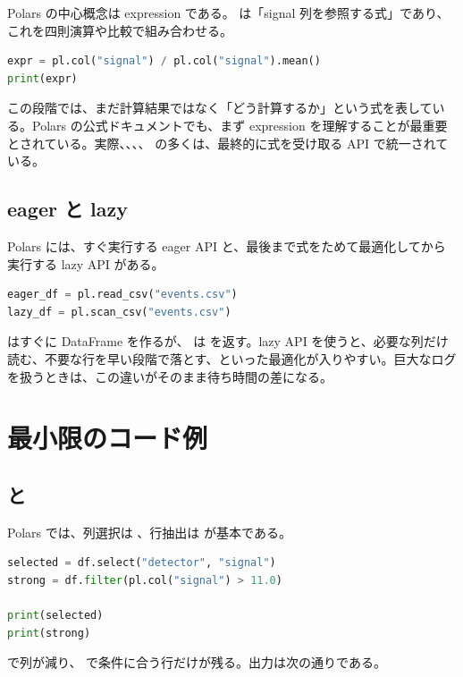 Polars の中心概念は expression である。 は「signal 列を参照する式」であり、これを四則演算や比較で組み合わせる。

\begin{lstlisting}[language=Python]
expr = pl.col("signal") / pl.col("signal").mean()
print(expr)
\end{lstlisting}

この段階では、まだ計算結果ではなく「どう計算するか」という式を表している。Polars の公式ドキュメントでも、まず expression を理解することが最重要とされている。実際、、、、 の多くは、最終的に式を受け取る API で統一されている。

\subsection{eager と lazy}

Polars には、すぐ実行する eager API と、最後まで式をためて最適化してから実行する lazy API がある。

\begin{lstlisting}[language=Python]
eager_df = pl.read_csv("events.csv")
lazy_df = pl.scan_csv("events.csv")
\end{lstlisting}

 はすぐに DataFrame を作るが、 は  を返す。lazy API を使うと、必要な列だけ読む、不要な行を早い段階で落とす、といった最適化が入りやすい。巨大なログを扱うときは、この違いがそのまま待ち時間の差になる。

\section{最小限のコード例}

\subsection{ と }

Polars では、列選択は 、行抽出は  が基本である。

\begin{lstlisting}[language=Python]
selected = df.select("detector", "signal")
strong = df.filter(pl.col("signal") > 11.0)

print(selected)
print(strong)
\end{lstlisting}

 で列が減り、 で条件に合う行だけが残る。出力は次の通りである。

